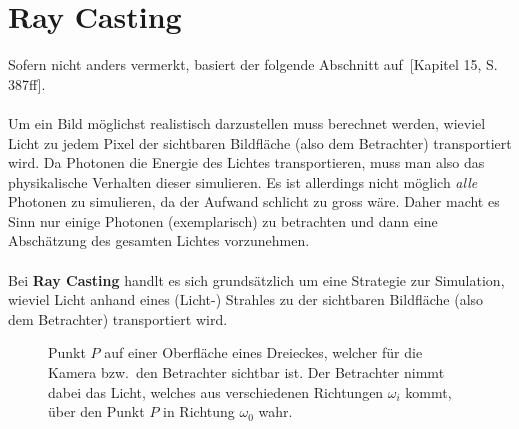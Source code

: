 \section{Ray Casting}
\label{sec:ray_casting}


Sofern nicht anders vermerkt, basiert der folgende Abschnitt
auf~\cite{hughes_computer_2013}[Kapitel 15, S. 387ff].\\
\\
Um ein Bild möglichst realistisch darzustellen muss berechnet werden, wieviel
Licht zu jedem Pixel der sichtbaren Bildfläche (also dem Betrachter)
transportiert wird. Da Photonen die Energie des Lichtes transportieren, muss
man also das physikalische Verhalten dieser simulieren. Es ist allerdings nicht
möglich \textit{alle} Photonen zu simulieren, da der Aufwand schlicht zu gross
wäre. Daher macht es Sinn nur einige Photonen (exemplarisch) zu betrachten und
dann eine Abschätzung des gesamten Lichtes vorzunehmen.\\
\\
Bei \textbf{Ray Casting} handlt es sich grundsätzlich um eine Strategie zur
Simulation, wieviel Licht anhand eines (Licht-) Strahles zu der sichtbaren
Bildfläche (also dem Betrachter) transportiert wird.

\begin{figure}[H]
    \centering {}
    \caption{Punkt $P$ auf einer Oberfläche eines Dreieckes, welcher für die Kamera bzw.\ den Betrachter sichtbar ist.
        Der Betrachter nimmt dabei das Licht, welches aus verschiedenen Richtungen $\omega_{i}$ kommt, über den Punkt $P$ in Richtung $\omega_{0}$ wahr.\label{fig:ray_casting:basics}\protect\footnotemark}
\end{figure}

